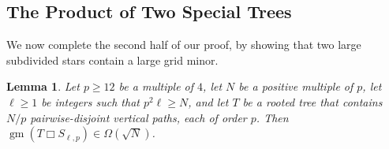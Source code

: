 \documentclass[lotsofwhite]{patmorin}
\newcommand{\boxprod}{\mathbin{\Box}}
\renewcommand{\ge}{\geqslant}
\renewcommand{\le}{\leqslant}
\DeclareMathOperator{\gm}{gm}
\newcommand{\pat}[1]{\textcolor{Maroon}{PM: #1}}
\theoremstyle{plain}
\newtheorem{lem}[thm]{Lemma}
\theoremstyle{definition}
\begin{document}
%
%

\subsection{The Product of Two Special Trees}

We now complete the second half of our proof, by showing that two large subdivided stars contain a large grid minor.

\begin{lem}\label{star_times_star}
  Let $p\ge 12$ be a multiple of $4$, let $N$ be a positive multiple of $p$, let $\ell\ge 1$ be integers such that $p^2\ell \ge N$, and let $T$ be a rooted tree that contains $N/p$ pairwise-disjoint vertical paths, each of order $p$.  Then $\gm(T\boxprod S_{\ell,p})\in \Omega(\sqrt{N})$.
\end{lem}
\end{document}
